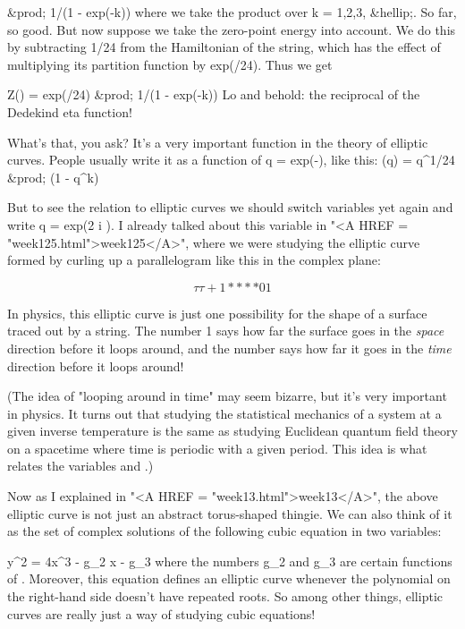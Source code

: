               &prod;  1/(1 - exp(-\beta k))
where we take the product over k = 1,2,3, &hellip;.
So far, so good.  But now suppose we take the zero-point energy into
account.  We do this by subtracting 1/24 from the Hamiltonian of the
string, which has the effect of multiplying its partition function by 
exp(\beta /24).  Thus we get

         Z(\beta )  =  exp(\beta /24)  &prod;  1/(1 - exp(-\beta k))
Lo and behold: the reciprocal of the Dedekind eta function!  

What's that, you ask?  It's a very important function in the theory of
elliptic curves.  People usually write it as a function of q = exp(-\beta ),
like this:
                 \eta (q) = 
q^{1/24} &prod; (1 - q^{k})

But to see the relation to elliptic curves we should switch variables
yet again and write q = exp(2 \pi  i \tau ).  I already talked about this
variable \tau  in "<A HREF = "week125.html">week125</A>", where we were studying the elliptic curve
formed by curling up a parallelogram like this in the complex plane:


$$

                         \tau             \tau  + 1 
                         *             *




                      *              *
                      0              1
$$
    

In physics, this elliptic curve is just one possibility for the shape of
a surface traced out by a string.  The number 1 says how far the surface
goes in the \emph{space} direction before it loops around, and the number 
\tau 
says how far it goes in the \emph{time} direction before it loops around!

(The idea of "looping around in time" may seem bizarre, but
it's very important in physics.  It turns out that studying the
statistical mechanics of a system at a given inverse temperature is the
same as studying Euclidean quantum field theory on a spacetime where
time is periodic with a given period.  This idea is what relates the
variables \beta  and \tau .)

Now as I explained in "<A HREF = "week13.html">week13</A>", the above elliptic curve is not just
an abstract torus-shaped thingie.  We can also think of it as the set of
complex solutions of the following cubic equation in two variables:

                        y^{2} = 4x^{3} - g_{2} x - g_{3}
where the numbers g_{2} and g_{3} are certain functions of 
\tau .  Moreover,
this equation defines an elliptic curve whenever the polynomial on
the right-hand side doesn't have repeated roots.  So among other things,
elliptic curves are really just a way of studying cubic equations!

